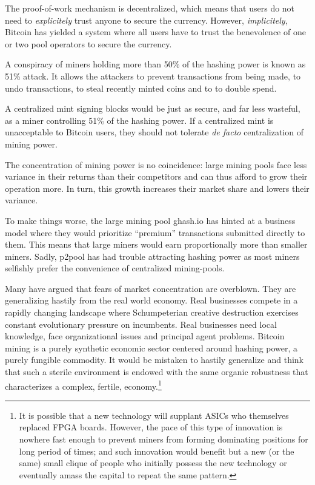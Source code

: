 \documentclass[letterpaper]{article}
\begin{document}
The proof-of-work mechanism is decentralized, which means that users do not
need to \emph{explicitely} trust anyone to secure the currency. However,
\emph{implicitely}, Bitcoin has yielded a system where all users have to trust
the benevolence of one or two pool operators to secure the currency.

A conspiracy of miners holding more than 50\% of the hashing power
is known as 51\% attack\cite{51pct}. It allows the attackers
to prevent transactions from being made, to undo transactions,
to steal recently minted coins and to to double spend\cite{centralized}.

A centralized mint signing blocks would be just as secure,
and far less wasteful, as a miner controlling 51\% of the hashing power.
If a centralized mint is unacceptable to Bitcoin users,
they should not tolerate \textit{de facto} centralization of mining power.

The concentration of mining power is no coincidence:
large mining pools face less variance in their returns than their competitors
and can thus afford to grow their operation more.
In turn, this growth increases their market share and lowers their variance.

To make things worse, the large mining pool ghash.io
has hinted at a business model where they would prioritize ``premium''
transactions submitted directly to them. This means that large miners would earn
proportionally more than smaller miners. Sadly, p2pool has had trouble
attracting hashing power as most miners selfishly prefer the convenience of
centralized mining-pools.

Many have argued that fears of market concentration are
overblown. They are generalizing hastily from the real world economy.
Real businesses compete in a rapidly changing landscape
where Schumpeterian creative destruction exercises
constant evolutionary pressure on incumbents.
Real businesses need local knowledge, face organizational issues
and principal agent problems. Bitcoin mining is a purely synthetic economic
sector centered around hashing power, a purely fungible commodity.
It would be mistaken to hastily generalize and think that such a sterile
environment is endowed with the same organic robustness that characterizes a
complex, fertile, economy.\footnote{It is possible that a new technology
will supplant ASICs who themselves replaced FPGA boards. However, the pace of
this type of innovation is nowhere fast enough to prevent miners from forming
dominating positions for long period of times; and such innovation would benefit
but a new (or the same) small clique of people who initially possess the new
technology or eventually amass the capital to repeat the same pattern.}
\end{document}
